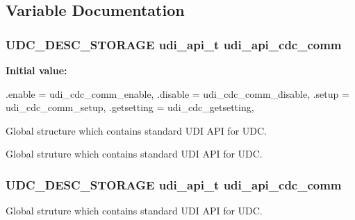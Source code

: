 \subsection{\-Variable \-Documentation}
\hypertarget{group__udi__cdc__group_gad7b0a90350a1f1a7c62fab1a749bf687}{
\subsubsection[{udi\-\_\-api\-\_\-cdc\-\_\-comm}]{\setlength{\rightskip}{0pt plus 5cm}\-U\-D\-C\-\_\-\-D\-E\-S\-C\-\_\-\-S\-T\-O\-R\-A\-G\-E {\bf udi\-\_\-api\-\_\-t} {\bf udi\-\_\-api\-\_\-cdc\-\_\-comm}}}
\label{group__udi__cdc__group_gad7b0a90350a1f1a7c62fab1a749bf687}
{\bfseries \-Initial value\-:}
\begin{DoxyCode}
 {
        .enable = udi_cdc_comm_enable,
        .disable = udi_cdc_comm_disable,
        .setup = udi_cdc_comm_setup,
        .getsetting = udi_cdc_getsetting,
}
\end{DoxyCode}


\-Global structure which contains standard \-U\-D\-I \-A\-P\-I for \-U\-D\-C. 

\-Global struture which contains standard \-U\-D\-I \-A\-P\-I for \-U\-D\-C. \hypertarget{group__udi__cdc__group_gad7b0a90350a1f1a7c62fab1a749bf687}{
\subsubsection[{udi\-\_\-api\-\_\-cdc\-\_\-comm}]{\setlength{\rightskip}{0pt plus 5cm}\-U\-D\-C\-\_\-\-D\-E\-S\-C\-\_\-\-S\-T\-O\-R\-A\-G\-E {\bf udi\-\_\-api\-\_\-t} {\bf udi\-\_\-api\-\_\-cdc\-\_\-comm}}}
\label{group__udi__cdc__group_gad7b0a90350a1f1a7c62fab1a749bf687}


\-Global struture which contains standard \-U\-D\-I \-A\-P\-I for \-U\-D\-C. 

